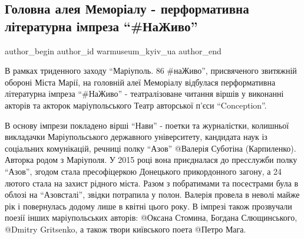  
 
 
 
 

\subsection{Головна алея Меморіалу - перформативна літературна імпреза \enquote{\#НаЖиво}}
\label{sec:22_05_2023.fb.warmuseum_kyiv_ua.1.golovna_aleja_memorialu_literaturna_impreza_nazhyvo}

\ifcmt
 author_begin
   author_id warmuseum_kyiv_ua
 author_end
\fi

В рамках триденного заходу \enquote{Маріуполь. 86 \#наЖиво}, присвяченого звитяжній
обороні Міста Марії, на головній алеї Меморіалу відбулася перформативна
літературна імпреза \enquote{\#НаЖиво} - театралізоване читання віршів у виконанні
акторів та акторок маріупольського Театр авторської п'єси \enquote{Conception}.

В основу імпрези покладено вірші  \enquote{Нави} - поетки та журналістки, колишньої
викладачки Маріупольського державного університету, кандидата наук із
соціальних комунікацій, речниці полку \enquote{Азов} @Валерія Суботіна (Карпиленко).
Авторка родом з Маріуполя. У 2015 році вона приєдналася до пресслужби полку
\enquote{Азов}, згодом стала пресофіцеркою Донецького прикордонного загону, а 24 лютого
стала на захист рідного міста. Разом з побратимами та посестрами була в облозі
на \enquote{Азовсталі}, звідки потрапила у полон. Валерія провела в неволі майже рік і
повернулась додому лише в квітні цього року. В імпрезі також прозвучали поезії
інших маріупольських авторів: @Оксана Стомина, Богдана Слющинського, @Dmitry
Gritsenko, а також твори київського поета @Петро Мага.

